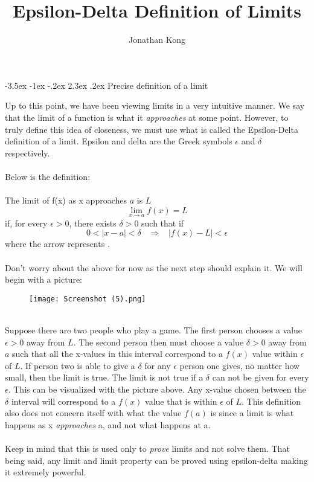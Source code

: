 \documentclass[11pt]{scrartcl}
\title{\normalfont\notesize\textbf{Epsilon-Delta Definition of Limits}}
\author{Jonathan Kong}
\date{}
\makeatletter
\renewcommand\section{\@startsection{section}{1}{\z@}%
                                   {-3.5ex \@plus -1ex \@minus -.2ex}%
                                   {2.3ex \@plus.2ex}%
                                   {\normalfont\large\bfseries}}
\makeatother
\begin{document}
\maketitle
\section{Precise definition of a limit}

\noindent 
Up to this point, we have been viewing limits in a very intuitive manner. We say that the limit of a function is what it \textit{approaches} at some point. However, to truly define this idea of closeness, we must use what is called the Epsilon-Delta definition of a limit. Epsilon and delta are the Greek symbols $\epsilon$ and $\delta$ respectively. \\
\noindent\\
Below is the definition:\\
\noindent\\
The limit of f(x) as x approaches $a$ is $L$
$$\lim_{x \to a} f(x)=L$$
\noindent
if, for every $\epsilon>0$, there exists $\delta>0$ such that if
$$0<\lvert x-a \rvert<\delta \;\;\;\Longrightarrow\;\;\; \lvert f(x)-L\rvert<\epsilon$$
where the arrow represents .\\
\noindent\\
Don't worry about the above for now as the next step should explain it. We will begin with a picture:
\begin{figure}[htp]
    \centering
    \texttt{[image: Screenshot (5).png]}
    
\end{figure}

\newpage
\noindent\\
Suppose there are two people who play a game. The first person chooses a value $\epsilon>0$ away from $L$. The second person then must choose a value $\delta>0$ away from $a$ such that all the x-values in this interval correspond to a $f(x)$ value within $\epsilon$ of $L$. If person two is able to give a $\delta$ for any $\epsilon$ person one gives, no matter how small, then the limit is true. The limit is not true if a $\delta$ can not be given for every $\epsilon$. This can be visualized with the picture above. Any x-value chosen between the $\delta$ interval will correspond to a $f(x)$ value that is within $\epsilon$ of $L$. This definition also does not concern itself with what the value $f(a)$ is since a limit is what happens as x \textit{approaches} a, and not what happens at a.\\
\noindent\\
Keep in mind that this is used only to \textit{prove} limits and not solve them. That being said, any limit and limit property can be proved using epsilon-delta making it extremely powerful. 
\end{document}
